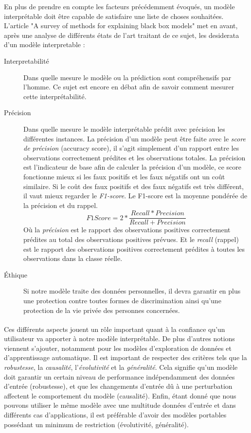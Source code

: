 En plus de prendre en compte les facteurs précédemment évoqués, un modèle interprétable doit être capable de satisfaire une liste de choses souhaitées. L'article "A survey of methods for explaining black box models"\cite{surveyExplaining} met en avant, après une analyse de différents états de l'art traitant de ce sujet, les desiderata d'un modèle interpretable :
\begin{description}
\item[Interpretabilité] Dans quelle mesure le modèle ou la prédiction sont compréhensifs par l'homme. Ce sujet est encore en débat afin de savoir comment mesurer cette interprétabilité.

\item[Précision] Dans quelle mesure le modèle interprétable prédit avec précision les différentes instances. La précision d'un modèle peut être faite avec le \textit{score de précision} (accuracy score), il s'agit simplement d'un rapport entre les observations correctement prédites et les observations totales. La précision est l'indicateur de base afin de calculer la précision d'un modèle, ce score fonctionne mieux si les faux positifs et les faux négatifs ont un coût similaire. Si le coût des faux positifs et des faux négatifs est très différent, il vaut mieux regarder le \textit{F1-score}. Le F1-score est la moyenne pondérée de la précision et du rappel.
\[
F1 Score = 2*\frac{Recall * Precision}{Recall + Precision}
\]
Où la \textit{précision} est le rapport des observations positives correctement prédites au total des observations positives prévues. Et le \textit{recall} (rappel) est le rapport des observations positives correctement prédites à toutes les observations dans la classe réelle.

\item[Éthique] Si notre modèle traite des données personnelles, il devra garantir en plus une protection contre toutes formes de discrimination ainsi qu'une protection de la vie privée des personnes concernées.\\
\end{description}

\paragraph{}Ces différents aspects jouent un rôle important quant à la confiance qu'un utilisateur va apporter à notre modèle interprétable. De plus d'autres notions viennent s'ajouter, notamment pour les modèles d'exploration de données et d'apprentissage automatique. Il est important de respecter des critères tels que la \textit{robustesse}, la \textit{causalité}, l'\textit{évolutivité} et la \textit{généralité}. Cela signifie qu'un modèle doit garantir un certain niveau de performance indépendamment des données d'entrée (robustesse), et que les changements d'entrée dû à une perturbation affectent le comportement du modèle (causalité). Enfin, étant donné que nous pouvons utiliser le même modèle avec une multitude données d'entrée et dans différents cas d'applications, il est préférable d'avoir des modèles portables possédant un minimum de restriction (évolutivité, généralité).

